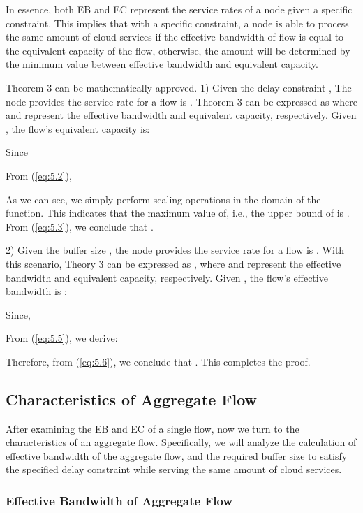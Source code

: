 \documentclass[a4paper]{article}
\begin{document}
In essence, both EB and EC represent the service rates of a node given a specific constraint. This implies that with a specific constraint, a
node is able to process the same amount of cloud services if the effective bandwidth of flow is equal to the equivalent capacity of the flow, otherwise, the amount will be determined by the minimum value  between effective bandwidth and equivalent capacity.

Theorem 3 can be mathematically approved. 1) Given the delay constraint , The node  provides the service rate for a flow is . Theorem 3 can be expressed as  where  and  represent the effective bandwidth and equivalent capacity, respectively. Given , the flow’s equivalent capacity is:



Since



From (\ref{eq:5.2}),



As we can see, we simply perform scaling operations in the domain of the function. This indicates that the maximum value of, i.e., the upper bound of  is . From (\ref{eq:5.3}), we conclude that .

2)  Given the buffer size , the node  provides the service rate for a flow is . With this scenario, Theory 3 can be expressed as , where  and  represent the effective bandwidth and equivalent capacity, respectively. Given , the flow’s effective bandwidth is :



Since,


From (\ref{eq:5.5}), we derive:



Therefore, from (\ref{eq:5.6}), we conclude that . This completes the proof.

\subsection{Characteristics of Aggregate Flow}

After examining the EB and EC of a single flow, now we turn to the characteristics of an aggregate flow. Specifically, we will analyze the calculation of effective bandwidth of the aggregate flow, and the required buffer size  to satisfy the specified delay constraint while serving the same amount of cloud services.

\subsubsection{Effective Bandwidth of Aggregate Flow}
\end{document}
